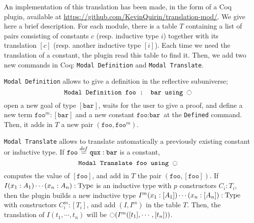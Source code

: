 An implementation of this translation has been made, in the form of a
Coq plugin, available at
\url{https://github.com/KevinQuirin/translation-mod/}. We give here a
brief description.
For each module, there is a table $T$ containing a list of pairs
consisting of constants $c$ (resp. inductive type $i$) together with
its translation $[c]$ (resp. another inductive type $[i]$). 
Each time we need the translation of a constant, the plugin read this
table to find it.
Then, we add two new commands in Coq: \texttt{Modal Definition} and
\texttt{Modal Translate}.

\texttt{Modal Definition} allows to give a definition in the reflective
subuniverse; 
\[\texttt{Modal Definition foo : bar using $\ocircle$}\]
open a new goal of type $[\texttt{bar}]$, waits for the user to give a
proof, and define a new term $\texttt{foo}^m:[\texttt{bar}]$ and a new
constant $\texttt{foo}:\texttt{bar}$ at the
\texttt{Defined} command. Then, it adds in $T$ a new pair
$(\texttt{foo},\texttt{foo}^m)$.

\texttt{Modal Translate} allows to translate automatically a
previously existing constant or inductive type.
If $\texttt{foo} \overset{de\hspace{-0.2ex}f}{=} \texttt{qux} : \texttt{bar}$ is a constant,
\[\texttt{Modal Translate foo using $\ocircle$}\]
computes the value of $[\texttt{foo}]$, and add in $T$ the pair
$(\texttt{foo},[\texttt{foo}])$.
If $I (x_1 : A_1) \cdots (x_n:A_n) : \operatorname{Type}$ is an inductive type with
$p$ constructors $C_i : T_i$, then the plugin builds a new inductive
type $I^m (x_1 : [A_1]) \cdots (x_n:[A_n]) : \operatorname{Type}$ with constructors 
$C_i^m : [T_i]$, and add $(I,I^m)$ in the table $T$. Then, the
translation of $I(t_1, \cdots, t_n)$ will be $\ocircle (I^m ([t_1], \cdots, [t_n]))$.



